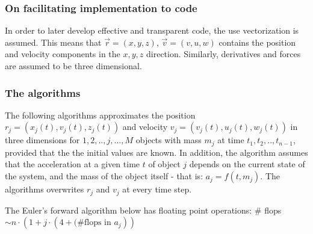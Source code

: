 \documentclass[%
oneside,                 %
final,                   %
10pt]{article}
\begin{document}
\subsubsection*{On facilitating implementation to code}
In order to later develop effective and transparent code, the use vectorization is assumed. This means that $\vec{r}=(x,y,z)$, $\vec{v}=(v,u,w)$ contains the position and velocity components in the $x,y,z$ direction. Similarly, derivatives and forces are assumed to be three dimensional.  \newline

\subsubsection*{The algorithms}
\label{subsec:algos}
The following algorithms approximates the position $r_j=(x_j(t),v_j(t),z_j(t))$ and velocity $v_j=(v_j(t),u_j(t),w_j(t))$ in three dimensions for $1,2,..,j,...,M$ objects with mass $m_j$ at time $t_1, t_2,..,t_{n-1}$, provided that the the initial values are known. In addition, the algorithm assumes that the acceleration at a given time $t$ of object $j$ depends on the current state of the system, and the mass of the object itself - that is: $a_j=f(t,m_j)$. The algorithms overwrites $r_j$ and $v_j$ at every time step. \newline

The Euler's forward algorithm below has floating point operations: \newline
\# flops$\sim n \cdot (1+j \cdot (4+\text{(\#flops in } a_j))$

\begin{center}\end{center}
\end{document}
